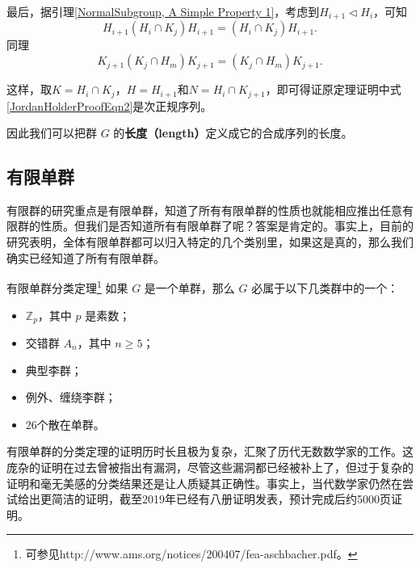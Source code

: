 最后，据引理\ref{NormalSubgroup, A Simple Property 1}，考虑到$H_{i+1}\lhd H_i$，可知
\begin{equation}
H_{i+1}(H_i\cap K_j)H_{i+1}=(H_i\cap K_j)H_{i+1}. 
\end{equation}
同理
\begin{equation}
    K_{j+1}(K_j\cap H_m)K_{j+1} = (K_j\cap H_m)K_{j+1}. 
\end{equation}

这样，取$K=H_i\cap K_j$，$H=H_{i+1}$和$N=H_i\cap K_{j+1}$，即可得证原定理证明中式\ref{JordanHolderProofEqn2}是次正规序列。










因此我们可以把群 $G$ 的\textbf{长度（length）}定义成它的合成序列的长度。

\subsection{有限单群}

有限群的研究重点是有限单群，知道了所有有限单群的性质也就能相应推出任意有限群的性质。但我们是否知道所有有限单群了呢？答案是肯定的。事实上，目前的研究表明，全体有限单群都可以归入特定的几个类别里，如果这是真的，那么我们确实已经知道了所有有限单群。

\begin{definition}{有限单群分类定理\footnote{可参见http://www.ams.org/notices/200407/fea-aschbacher.pdf。}}
如果 $G$ 是一个单群，那么 $G$ 必属于以下几类群中的一个：
\begin{itemize}
\item $\mathbb{Z}_p$，其中 $p$ 是素数；
\item 交错群 $A_n$，其中 $n\geq 5$；
\item 典型李群；
\item 例外、缠绕李群；
\item 26个散在单群。
\end{itemize}
\end{definition}

有限单群的分类定理的证明历时长且极为复杂，汇聚了历代无数数学家的工作。这庞杂的证明在过去曾被指出有漏洞，尽管这些漏洞都已经被补上了，但过于复杂的证明和毫无美感的分类结果还是让人质疑其正确性。事实上，当代数学家仍然在尝试给出更简洁的证明，截至2019年已经有八册证明发表，预计完成后约5000页证明。












